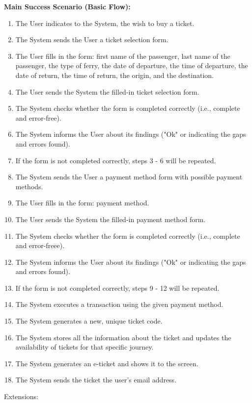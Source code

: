 \textbf{Main Success Scenario (Basic Flow):}
\begin{enumerate}
\item The User indicates to the System, the wish to buy a ticket.
\item The System sends the User a ticket selection form.
\item The User fills in the form: first name of the passenger, last name of the passenger, the type of ferry, the date of departure, the time of departure, the date of return, the time of return, the origin, and the destination.
\item The User sends the System the filled-in ticket selection form.
\item The System checks whether the form is completed correctly (i.e., complete and error-free).
\item The System informs the User about its findings ("Ok" or indicating the gaps and errors found).
\item If the form is not completed correctly, steps 3 - 6 will be repeated.
\item The System sends the User a payment method form with possible payment methods.
\item The User fills in the form: payment method.
\item The User sends the System the filled-in payment method form.
\item The System checks whether the form is completed correctly (i.e., complete and error-freee).
\item The System informs the User about its findings ("Ok" or indicating the gaps and errors found).
\item If the form is not completed correctly, steps 9 - 12 will be repeated.
\item The System executes a transaction using the given payment method.
\item The System generates a new, unique ticket code.
\item The System stores all the information about the ticket and updates the availability of tickets for that specific journey.
\item The System generates an e-ticket and shows it to the screen.
\item The System sends the ticket the user's email address.
\end{enumerate}
Extensions:
